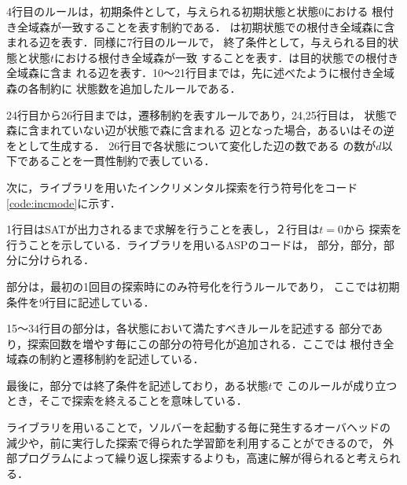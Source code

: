 4行目のルールは，初期条件として，与えられる初期状態と状態0における
根付き全域森が一致することを表す制約である．
は初期状態での根付き全域森に含まれる辺を表す．同様に7行目のルールで，
終了条件として，与えられる目的状態と状態$t$における根付き全域森が一致
することを表す．は目的状態での根付き全域森に含ま
れる辺を表す．10〜21行目までは，先に述べたように根付き全域森の各制約に
状態数を追加したルールである．

24行目から26行目までは，遷移制約を表すルールであり，24,25行目は，
状態で森に含まれていない辺が状態で森に含まれる
辺となった場合，あるいはその逆をとして生成する．
26行目で各状態について変化した辺の数である
の数が$d$以下であることを一貫性制約で表している．

次に，ライブラリを用いたインクリメンタル探索を行う符号化をコード
\ref{code:incmode}に示す．

1行目はSATが出力されるまで求解を行うことを表し，２行目は$t=0$から
探索を行うことを示している．ライブラリを用いるASPのコードは，
部分，部分，部分に分けられる．

部分は，最初の1回目の探索時にのみ符号化を行うルールであり，
ここでは初期条件を9行目に記述している．

15〜34行目の部分は，各状態において満たすべきルールを記述する
部分であり，探索回数を増やす毎にこの部分の符号化が追加される．ここでは
根付き全域森の制約と遷移制約を記述している．

最後に，部分では終了条件を記述しており，ある状態$t$で
このルールが成り立つとき，そこで探索を終えることを意味している．

ライブラリを用いることで，ソルバーを起動する毎に発生するオーバヘッドの
減少や，前に実行した探索で得られた学習節を利用することができるので，
外部プログラムによって繰り返し探索するよりも，高速に解が得られると考えられる．

\onecolumn



\twocolumn